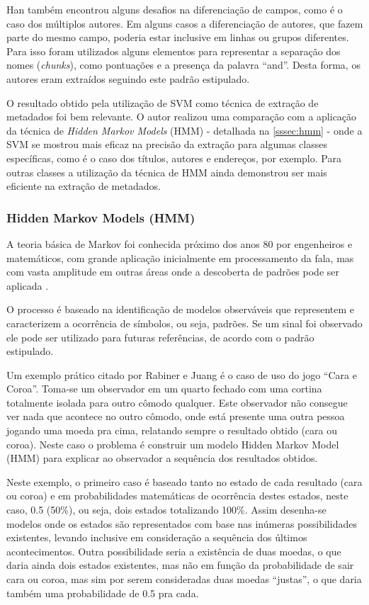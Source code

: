 Han também encontrou alguns desafios na diferenciação de campos, como é o caso dos múltiplos autores. Em alguns casos a diferenciação de autores, que fazem parte do mesmo campo, poderia estar inclusive em linhas ou grupos diferentes. Para isso foram utilizados alguns elementos para representar a separação dos nomes (\textit{chunks}), como pontuações e a presença da palavra ``and''. Desta forma, os autores eram extraídos seguindo este padrão estipulado.

O resultado obtido pela utilização de SVM como técnica de extração de metadados foi bem relevante. O autor realizou uma comparação com a aplicação da técnica de \emph{Hidden Markov Models} (HMM) - detalhada na \autoref{sssec:hmm} - onde a SVM se mostrou mais eficaz na precisão da extração para algumas classes específicas, como é o caso dos títulos, autores e endereços, por exemplo. Para outras classes a utilização da técnica de HMM ainda demonstrou ser mais eficiente na extração de metadados.

\subsubsection{Hidden Markov Models (HMM)}
\label{sssec:hmm}

A teoria básica de Markov foi conhecida próximo dos anos 80 por engenheiros e matemáticos, com grande aplicação inicialmente em processamento da fala, mas com vasta amplitude em outras áreas onde a descoberta de padrões pode ser aplicada \cite{Rabiner-HMM}.

O processo é baseado na identificação de modelos observáveis que representem e caracterizem a ocorrência de símbolos, ou seja, padrões. Se um sinal foi observado ele pode ser utilizado para futuras referências, de acordo com o padrão estipulado. 

Um exemplo prático citado por Rabiner e Juang \cite{Rabiner-HMM} é o caso de uso do jogo ``Cara e Coroa''. Toma-se um observador em um quarto fechado com uma cortina totalmente isolada para outro cômodo qualquer. Este observador não consegue ver nada que acontece no outro cômodo, onde está presente uma outra pessoa jogando uma moeda pra cima, relatando sempre o resultado obtido (cara ou coroa). Neste caso o problema é construir um modelo Hidden Markov Model (HMM) para explicar ao observador a sequência dos resultados obtidos. 

Neste exemplo, o primeiro caso é baseado tanto no estado de cada resultado (cara ou coroa) e em probabilidades matemáticas de ocorrência destes estados, neste caso, 0.5 (50\%), ou seja, dois estados totalizando 100\%. Assim desenha-se modelos onde os estados são representados com base nas inúmeras possibilidades existentes, levando inclusive em consideração a sequência dos últimos acontecimentos. Outra possibilidade seria a existência de duas moedas, o que daria ainda dois estados existentes, mas não em função da probabilidade de sair cara ou coroa, mas sim por serem consideradas duas moedas ``justas'', o que daria também uma probabilidade de 0.5 pra cada.


